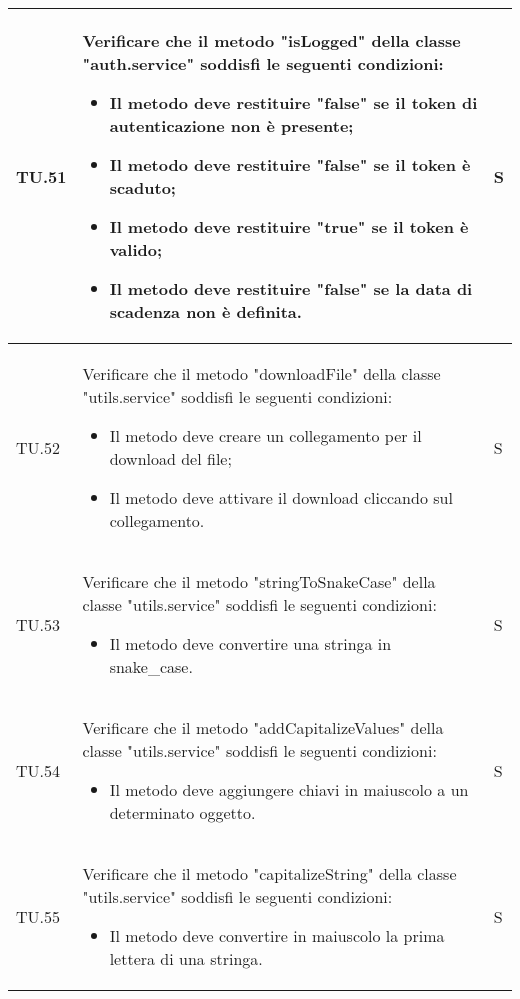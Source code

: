 \begin{adjustwidth}{-0.5cm}{-0.5cm}
\begin{longtable}{|P{1.5cm}|>{\raggedright}P{9.5cm}|>{\arraybackslash}P{1.5cm}|}
		\hline TU.51 & Verificare che il metodo "isLogged" della classe "auth.service" soddisfi le seguenti condizioni:
		\begin{itemize}
			\item Il metodo deve restituire "false" se il token di autenticazione non è presente;
			\item Il metodo deve restituire "false" se il token è scaduto;
			\item Il metodo deve restituire "true" se il token è valido;
			\item Il metodo deve restituire "false" se la data di scadenza non è definita.
    \end{itemize} & S \\

		\hline TU.52 & Verificare che il metodo "downloadFile" della classe "utils.service" soddisfi le seguenti condizioni:
		\begin{itemize}
			\item Il metodo deve creare un collegamento per il download del file;
			\item Il metodo deve attivare il download cliccando sul collegamento.
    \end{itemize} & S \\

		\hline TU.53 & Verificare che il metodo "stringToSnakeCase" della classe "utils.service" soddisfi le seguenti condizioni:
		\begin{itemize}
			\item Il metodo deve convertire una stringa in snake\_case.
    \end{itemize} & S \\

		\hline TU.54 & Verificare che il metodo "addCapitalizeValues" della classe "utils.service" soddisfi le seguenti condizioni:
		\begin{itemize}
			\item Il metodo deve aggiungere chiavi in maiuscolo a un determinato oggetto.
    \end{itemize} & S \\

		\hline TU.55 & Verificare che il metodo "capitalizeString" della classe "utils.service" soddisfi le seguenti condizioni:
		\begin{itemize}
			\item Il metodo deve convertire in maiuscolo la prima lettera di una stringa.
    \end{itemize} & S \\
	\end{longtable}
\end{adjustwidth}
\egroup
